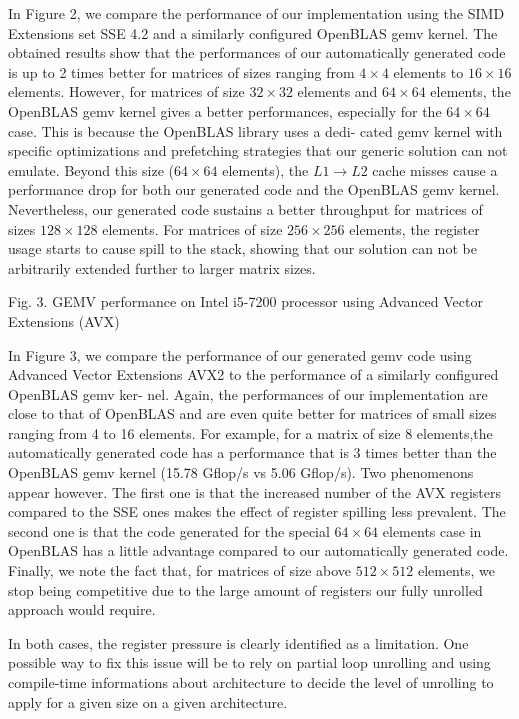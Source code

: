 \documentclass[../../main.tex]{subfiles}
\begin{document}
In Figure 2, we compare the performance of our implementation
using the SIMD Extensions set SSE 4.2 and a similarly
configured OpenBLAS gemv kernel. The obtained results show
that the performances of our automatically generated code is
up to 2 times better for matrices of sizes ranging from $4 \times 4$
elements to $16 \times 16$ elements. However, for matrices of size
$32 \times 32$ elements and $64 \times 64$ elements, the OpenBLAS gemv
kernel gives a better performances, especially for the $64 \times 64$
case. This is because the OpenBLAS library uses a dedi-
cated gemv kernel with specific optimizations and prefetching
strategies that our generic solution can not emulate. Beyond
this size ($64 \times 64$ elements), the $L1 \rightarrow L2$ cache misses
cause a performance drop for both our generated code and
the OpenBLAS gemv kernel. Nevertheless, our generated code
sustains a better throughput for matrices of sizes $128 \times 128$
elements. For matrices of size $256 \times 256$ elements, the register
usage starts to cause spill to the stack, showing that our
solution can not be arbitrarily extended further to larger matrix sizes.

Fig. 3. GEMV performance on Intel i5-7200 processor using Advanced Vector
Extensions (AVX)

In Figure 3, we compare the performance of our generated
gemv code using Advanced Vector Extensions AVX2 to the
performance of a similarly configured OpenBLAS gemv ker-
nel. Again, the performances of our implementation are close
to that of OpenBLAS and are even quite better for matrices of
small sizes ranging from 4 to 16 elements. For example, for a
matrix of size 8 elements,the automatically generated code has
a performance that is 3 times better than the OpenBLAS gemv
kernel (15.78 Gflop/s vs 5.06 Gflop/s). Two phenomenons
appear however. The first one is that the increased number
of the AVX registers compared to the SSE ones makes the
effect of register spilling less prevalent. The second one is
that the code generated for the special $64 \times 64$ elements
case \cite{hpcs23} in OpenBLAS has a little advantage compared to
our automatically generated code. Finally, we note the fact
that, for matrices of size above $512 \times 512$ elements, we stop
being competitive due to the large amount of registers our
fully unrolled approach would require.

In both cases, the register pressure is clearly identified as a
limitation. One possible way to fix this issue will be to rely
on partial loop unrolling and using compile-time informations
about architecture to decide the level of unrolling to apply for
a given size on a given architecture.
\end{document}
